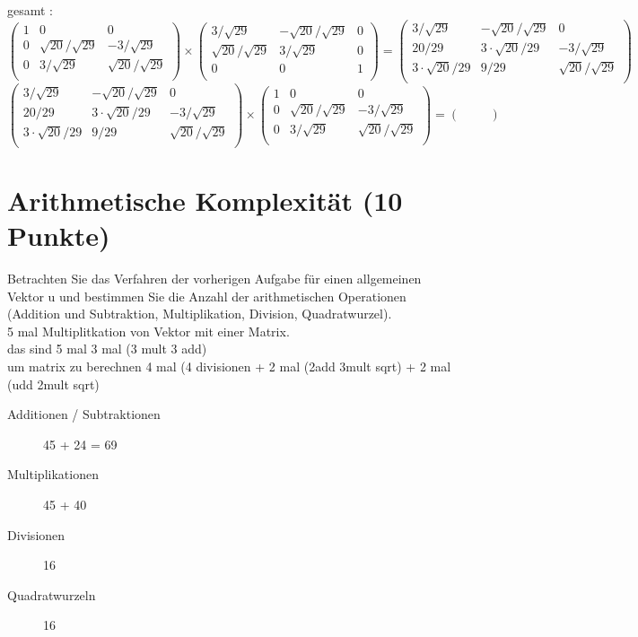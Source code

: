 \documentclass[11pt]{article}
\begin{document}
gesamt : 
$$
\begin{pmatrix}
1 & 0 & 0 \\
0 & \sqrt{20}/\sqrt{29} & -3/ \sqrt{29}\\
0 & 3/ \sqrt{29} & \sqrt{20}/\sqrt{29} \\
\end{pmatrix}
\times
\begin{pmatrix}
3/ \sqrt{29} & -\sqrt{20}/\sqrt{29} & 0 \\
\sqrt{20}/\sqrt{29} & 3/ \sqrt{29} & 0 \\
0 & 0 & 1 \\
\end{pmatrix}
=
\begin{pmatrix}
3/ \sqrt{29} & -\sqrt{20}/\sqrt{29} & 0 \\
20 / 29 & 3 \cdot \sqrt{20}/29 & -3/ \sqrt{29} \\
3 \cdot \sqrt{20}/29 & 9 /29 & \sqrt{20}/\sqrt{29} \\
\end{pmatrix}
$$
$$
\begin{pmatrix}
3/ \sqrt{29} & -\sqrt{20}/\sqrt{29} & 0 \\
20 / 29 & 3 \cdot \sqrt{20}/29 & -3/ \sqrt{29} \\
3 \cdot \sqrt{20}/29 & 9 /29 & \sqrt{20}/\sqrt{29} \\
\end{pmatrix}
\times
\begin{pmatrix}
1 & 0 & 0 \\
0 & \sqrt{20}/\sqrt{29} & -3/ \sqrt{29}\\
0 & 3/ \sqrt{29} & \sqrt{20}/\sqrt{29} \\
\end{pmatrix}
=
\begin{pmatrix}
 & & 
\end{pmatrix}
$$


\section{Arithmetische Komplexität (10 Punkte)}
Betrachten Sie das Verfahren der vorherigen Aufgabe für einen allgemeinen Vektor u und bestimmen Sie die Anzahl der arithmetischen Operationen (Addition und Subtraktion, Multiplikation, Division, Quadratwurzel).\\
5 mal Multiplitkation von Vektor mit einer Matrix.\\
das sind 5 mal 3 mal (3 mult 3 add)\\
um matrix zu berechnen 4 mal (4 divisionen + 2 mal (2add 3mult sqrt) + 2 mal (udd 2mult sqrt)
\begin{description}
\item[Additionen / Subtraktionen] 45 + 24 = 69
\item[Multiplikationen] 45 + 40
\item[Divisionen]16
\item[Quadratwurzeln] 16
\end{description}
\end{document}
